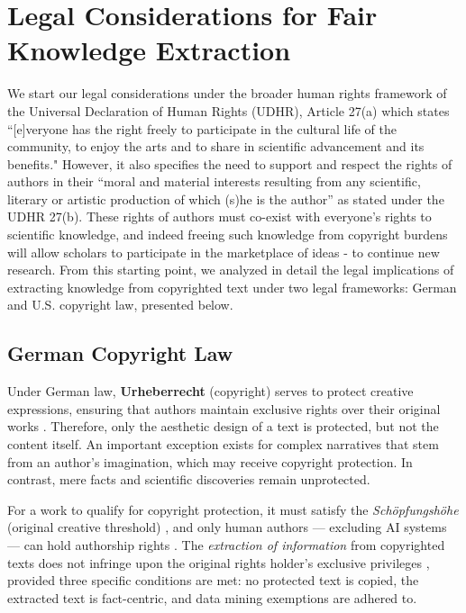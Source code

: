 \vspace{-0.2cm}
\section{Legal Considerations for Fair Knowledge Extraction}

We start our legal considerations under the broader human rights framework of the Universal Declaration of Human Rights (UDHR), Article 27(a) which states ``[e]veryone has the right freely to participate in the cultural life of the community, to enjoy the arts and to share in scientific advancement and its benefits." However, it also specifies the need to support and respect the rights of authors in their “moral and material interests resulting from any scientific, literary or artistic production of which (s)he is the author” as stated under the UDHR 27(b). These rights of authors must co-exist with everyone's rights to scientific knowledge, and indeed freeing such knowledge from copyright burdens will allow scholars to participate in the marketplace of ideas - to continue new research. From this starting point, we analyzed in detail the legal implications of extracting knowledge from copyrighted text under two legal frameworks: German and U.S. copyright law, presented below.

\subsection{German Copyright Law}

Under German law, \textbf{Urheberrecht} (copyright) serves to protect creative expressions, ensuring that authors maintain exclusive rights over their original works \cite{wandtke2010urheberrecht, geller2009german}. Therefore, only the aesthetic design of a text is protected, but not the content itself. An important exception exists for complex narratives that stem from an author's imagination, which may receive copyright protection. In contrast, mere facts and scientific discoveries remain unprotected.

For a work to qualify for copyright protection, it must satisfy the \emph{Schöpfungshöhe} (original creative threshold) \cite{wandtke2010urheberrecht, hoffmann2011copyrights}, and only human authors — excluding AI systems — can hold authorship rights \cite{gratz2021kunstliche, legner2019erzeugnisse}. The \emph{extraction of information} from copyrighted texts does not infringe upon the original rights holder’s exclusive privileges \citep{bmbf2020copyright}, provided three specific conditions are met: no protected text is copied, the extracted text is fact-centric, and data mining exemptions are adhered to.

